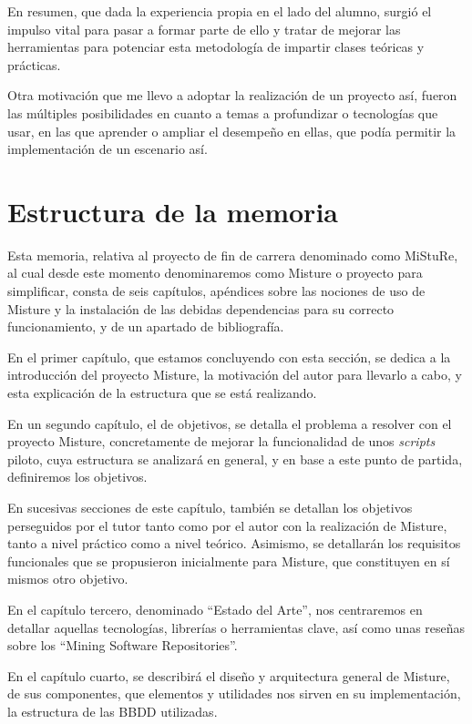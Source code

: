 En resumen, que dada la experiencia propia en el lado del alumno, surgió el impulso vital para pasar a formar parte de ello y tratar de mejorar las herramientas para potenciar esta metodología de impartir clases teóricas y prácticas.


Otra motivación que me llevo a adoptar la realización de un proyecto así, fueron las múltiples posibilidades en cuanto a temas a profundizar o tecnologías que usar, en las que aprender o ampliar el desempeño en ellas, que podía permitir la implementación de un escenario así.


\section{Estructura de la memoria}

Esta memoria, relativa al proyecto de fin de carrera denominado como MiStuRe, al cual desde este momento denominaremos como Misture o proyecto para simplificar, consta de seis capítulos, apéndices sobre las nociones de uso de Misture y la instalación de las debidas dependencias para su correcto funcionamiento, y de un apartado de bibliografía.


En el primer capítulo, que estamos concluyendo con esta sección, se dedica a la introducción del proyecto Misture, la motivación del autor para llevarlo a cabo, y esta explicación de la estructura que se está realizando.


En un segundo capítulo, el de objetivos, se detalla el problema a resolver con el proyecto Misture, concretamente de mejorar la funcionalidad de unos \textit{scripts} piloto, cuya estructura se analizará en general, y en base a este punto de partida, definiremos los objetivos.


En sucesivas secciones de este capítulo, también se detallan los objetivos perseguidos por el tutor tanto como por el autor con la realización de Misture, tanto a nivel práctico como a nivel teórico. Asimismo, se detallarán los requisitos funcionales que se propusieron inicialmente para Misture, que constituyen en sí mismos otro objetivo.


En el capítulo tercero, denominado ``Estado del Arte'', nos centraremos en detallar aquellas tecnologías, librerías o herramientas clave, así como unas reseñas sobre los ``Mining Software Repositories''.


En el capítulo cuarto, se describirá el diseño y arquitectura general de Misture, de sus componentes, que elementos y utilidades nos sirven en su implementación, la estructura de las BBDD utilizadas.


